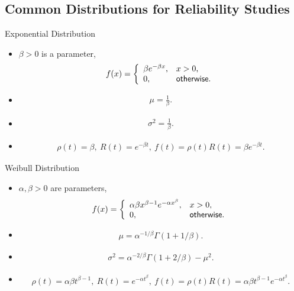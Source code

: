 \subsection{Common Distributions for Reliability Studies}

\begin{frame}{Exponential Distribution}

\begin{itemize}
	\item {} $\beta > 0$ is a parameter,
	\begin{align*}
	f(x) = \left\{
	\begin{array}{ll}
	\beta e^{-\beta x}, & x > 0, \\
	0, & \mathsf{otherwise.}
	\end{array}
	\right.
	\end{align*}
	\item {}
	\begin{align*}
	\mu = \frac{1}{\beta}.
	\end{align*}
	\item {}
	\begin{align*}
	\sigma^2 = \frac{1}{\beta}.
	\end{align*}
	\item {}
	\begin{align*}
	\rho(t) = \beta, \ R(t) = e^{-\beta t}, \ f(t) = \rho(t)R(t) = \beta e^{-\beta t}.
	\end{align*}
\end{itemize}

\end{frame}

\begin{frame}{Weibull Distribution}

\begin{itemize}
	\item {} $\alpha, \beta > 0$ are parameters,
	\begin{align*}
	f(x) = \left\{
	\begin{array}{ll}
	\alpha\beta x^{\beta-1} e^{-\alpha x^{\beta}}, & x > 0, \\
	0, & \mathsf{otherwise.}
	\end{array}
	\right.
	\end{align*}
	\item {}
	\begin{align*}
	\mu = \alpha^{-1/\beta} \Gamma(1 + 1/\beta).
	\end{align*}
	\item {}
	\begin{align*}
	\sigma^2 = \alpha^{-2/\beta} \Gamma(1 + 2/\beta) - \mu^2.
	\end{align*}
	\item {}
	\begin{align*}
	\rho(t) = \alpha\beta t^{\beta-1}, \ R(t) = e^{-\alpha t^{\beta}}, \ f(t) = \rho(t)R(t) = \alpha\beta t^{\beta-1}e^{-\alpha t^{\beta}}.
	\end{align*}
\end{itemize}

\end{frame}


